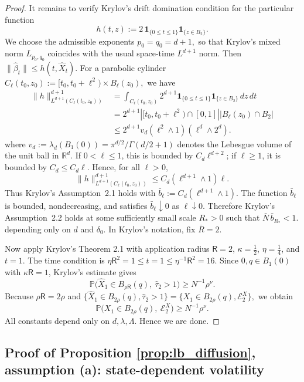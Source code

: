 \documentclass{article}
\newcommand{\1}{\mathbbm{1}}
\numberwithin{equation}{section}
\begin{document}
\begin{proof}
It remains to verify Krylov's drift domination condition for the particular
function
\[
h(t,z):=
2\,\mathbf 1_{\{0\le t\le1\}}\mathbf 1_{\{z\in B_2\}} .
\]
We choose the admissible exponents
$
p_0=q_0=d+1,
$
so that Krylov's mixed norm $L_{p_0,q_0}$ coincides with the usual
space-time $L^{d+1}$ norm. Then
$
\|\widehat\beta_t\|\le h(t,\widehat X_t).
$ For a parabolic cylinder
$
C_\ell(t_0,z_0):=[t_0,t_0+\ell^2)\times B_\ell(z_0),
$
we have
\[
\begin{aligned}
\|h\|_{L^{d+1}(C_\ell(t_0,z_0))}^{d+1}
&=
\int_{C_\ell(t_0,z_0)}
2^{d+1}
\mathbf 1_{\{0\le t\le1\}}\mathbf 1_{\{z\in B_2\}}
\,dz\,dt  \\
&=
2^{d+1}
\left|[t_0,t_0+\ell^2)\cap[0,1]\right|
\left|B_\ell(z_0)\cap B_2\right|  \\
&\le
2^{d+1}v_d(\ell^2\wedge1)(\ell^d\wedge 2^d).
\end{aligned}
\]
where $v_d:=\lambda_d(B_1(0))=\pi^{d/2}/\Gamma(d/2+1)$ denotes the
Lebesgue volume of the unit ball in $\mathbb R^d$. If $0<\ell\le1$, this is bounded by $C_d\ell^{d+2}$; if
$\ell\ge1$, it is bounded by $C_d\le C_d\ell$. Hence, for all
$\ell>0$,
\[
\|h\|_{L^{d+1}(C_\ell(t_0,z_0))}^{d+1}
\le
C_d(\ell^{d+1}\wedge1)\ell .
\]
Thus Krylov's Assumption~2.1 holds with
$
\bar b_\ell:=C_d(\ell^{d+1}\wedge1).
$ The function $\bar b_\ell$ is bounded, nondecreasing, and satisfies
$\bar b_\ell\downarrow0$ as $\ell\downarrow0$. Therefore Krylov's
Assumption~2.2 holds at some sufficiently small scale
$R_\ast>0$ such that
$
\bar N\,\bar b_{R_\ast}<1.
$ depending only on $d$ and $\delta_0$.
In Krylov's notation, fix $\overline R=2$.

Now apply Krylov's Theorem 2.1 with application radius
$
\mathsf R=2$, $\kappa=\frac12$,
$\eta=\frac14$, and $t=1$.
The time condition is
$
\eta\mathsf R^2=1\le t=1\le \eta^{-1}\mathsf R^2=16.
$
Since $0,q\in B_1(0)$ with $\kappa {\mathsf R}=1$, Krylov's estimate gives
\[
\mathbb P\bigl(
\widehat X_1\in B_{\rho\mathsf R}(q),\
\widehat\tau_2>1
\bigr)
\ge N^{-1}\rho^\nu .
\]
Because $\rho\mathsf R=2\rho$ and
$
\{\widehat X_1\in B_{2\rho}(q),\widehat\tau_2>1\}
=
\{X_1\in B_{2\rho}(q),\mathcal E_2^X\},
$ we obtain
\[
\mathbb P\bigl(X_1\in B_{2\rho}(q),\ \mathcal E_2^X\bigr)
\ge N^{-1}\rho^\nu .
\]
All constants depend only on $d,\lambda,\Lambda$. Hence we are done.
\end{proof}
\subsection{Proof of Proposition \ref{prop:lb_diffusion}, assumption (a): state-dependent volatility}\label{sec:proof_prop_34_second}
\end{document}
